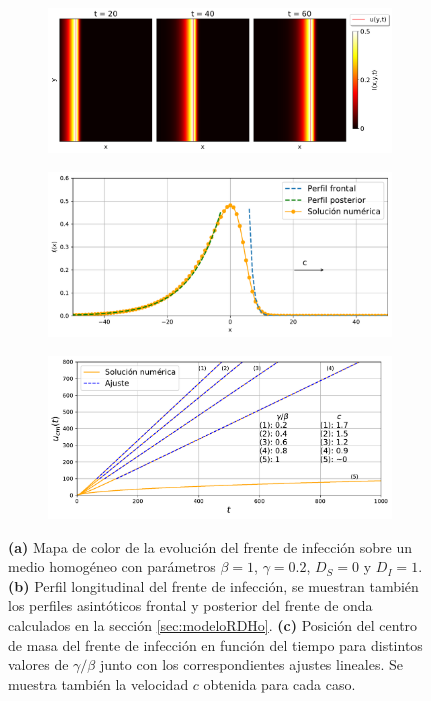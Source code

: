 \begin{figure}[!h]
    \centering
    \begin{subfigure}{1\textwidth}
      \centering
      \includegraphics[width=.87\textwidth]{h_case.pdf}
      \caption{}
    \end{subfigure}
    \begin{subfigure}{1\textwidth}
      \centering
      \includegraphics[width=.87\textwidth]{f_I(x)_hom.pdf}
      \caption{}
    \end{subfigure}
    \begin{subfigure}{1\textwidth}
        \centering
        \includegraphics[width=.87\textwidth]{u_cm(t).pdf}
        \caption{}
    \end{subfigure}
    \caption{\textbf{(a)} Mapa de color de la evolución del frente de infección sobre un medio homogéneo con parámetros $\beta=1$, $\gamma=0.2$, $D_S=0$ y $D_I=1$.
    \textbf{(b)} Perfil longitudinal del frente de infección, se muestran también los perfiles asintóticos frontal y posterior 
    del frente de onda calculados en la sección \ref{sec:modeloRDHo}. \textbf{(c)} Posición del centro de masa del frente de infección en función del tiempo para distintos valores de $\gamma/\beta$ junto con los correspondientes ajustes lineales. Se muestra también la velocidad $c$ obtenida para cada caso.}
    \label{fig:h_case}
\end{figure}

